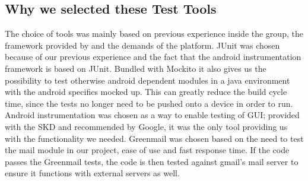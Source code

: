 \subsection{Why we selected these Test Tools}
The choice of tools was mainly based on previous experience inside the group, the framework provided by and the demands of the platform. 
\newline
\newline
JUnit was chosen because of our previous experience and the fact that the android instrumentation framework is based on JUnit. Bundled with Mockito it also gives us the possibility to test otherwise android dependent modules in a java environment with the android specifics mocked up. This can greatly reduce the build cycle time, since the tests no longer need to be pushed onto a device in order to run. 
\newline
\newline
Android instrumentation was chosen as a way to enable testing of GUI; provided with the SKD and recommended by Google, it was the only tool providing us with the functionality we needed.
\newline
\newline
Greenmail was chosen based on the need to test the mail module in our project, ease of use and fast response time. If the code passes the Greenmail tests, the code is then tested against gmail’s mail server to ensure it functions with external servers as well. 
